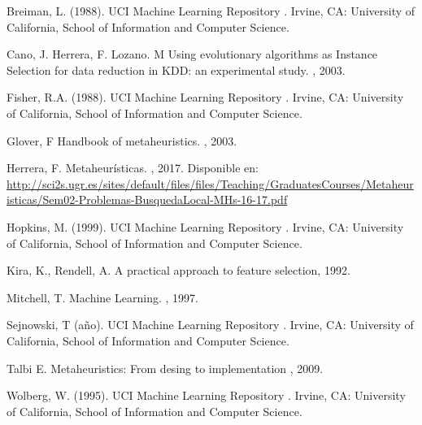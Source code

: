\documentclass{ci5652}
\begin{document}
\begin{thebibliography}{99}

Breiman, L. (1988). UCI Machine Learning Repository
.
\newblock Irvine, CA: University of California, School of Information and Computer Science.

Cano, J. Herrera, F. Lozano. M
\newblock Using evolutionary algorithms as Instance Selection for data
reduction in KDD: an experimental study.
, 2003.

Fisher, R.A. (1988). UCI Machine Learning Repository
.
\newblock Irvine, CA: University of California, School of Information and Computer Science.

Glover, F
\newblock Handbook of metaheuristics.
, 2003.

Herrera, F.
\newblock Metaheurísticas.
, 2017. Disponible en:
\url{http://sci2s.ugr.es/sites/default/files/files/Teaching/GraduatesCourses/Metaheuristicas/Sem02-Problemas-BusquedaLocal-MHs-16-17.pdf}

Hopkins, M. (1999). UCI Machine Learning Repository
.
\newblock Irvine, CA: University of California, School of Information and Computer Science.

Kira, K., Rendell, A.
\newblock A practical approach to feature selection, 1992.

Mitchell, T.
\newblock Machine Learning.
, 1997.

Sejnowski, T (año). UCI Machine Learning Repository
.
\newblock Irvine, CA: University of California, School of Information and Computer Science.

Talbi E.
\newblock Metaheuristics: From desing to implementation
, 2009.

Wolberg, W. (1995). UCI Machine Learning Repository
.
\newblock Irvine, CA: University of California, School of Information and Computer Science.

%
\end{thebibliography}
\end{document}
